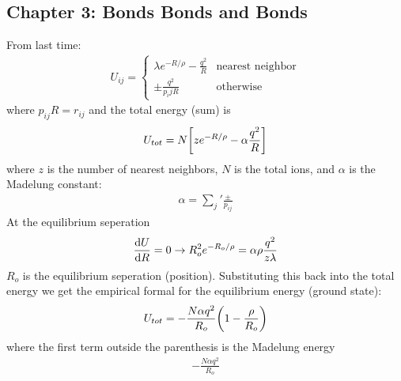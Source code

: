\documentclass[../main.tex]{subfiles}
\begin{document}
\subsection*{Chapter 3: Bonds Bonds and Bonds}
From last time:
\begin{align*}
    U_{ij} = \begin{cases}
        \lambda e^{-R/\rho} - \frac{q^2}{R} & \text{nearest neighbor} \\
        \pm \frac{q^2}{p_ijR} & \text{otherwise}
    \end{cases}
\end{align*}
where $p_{ij}R = r_{ij}$ and the total energy (sum) is
\begin{align*}
    U_{tot} = N \qt[z e^{-R/\rho} - \alpha \frac{q^2}{R}]
\end{align*}
where $z$ is the number of nearest neighbors, $N$ is the total ions, and $\alpha$ is the Madelung
constant:
\begin{align*}
    \alpha = \sum_j' \frac{\pm}{p_{ij}}
\end{align*}
At the equilibrium seperation
\begin{align*}
    \dv{U}{R} = 0 \rightarrow R_o^2 e^{-R_o/\rho} = \alpha \rho \frac{q^2}{z\lambda}
\end{align*}
$R_o$ is the equilibrium seperation (position). Substituting this back into the total energy we get
the empirical formal for the equilibrium energy (ground state):
\begin{align*}
    U_{tot} = -\frac{N\alpha q^2}{R_o} \qt(1 - \frac{\rho}{R_o})
\end{align*} 
where the first term outside the parenthesis is the Madelung energy
\begin{align*}
    -\frac{N\alpha q^2}{R_o}
\end{align*}
\end{document}
